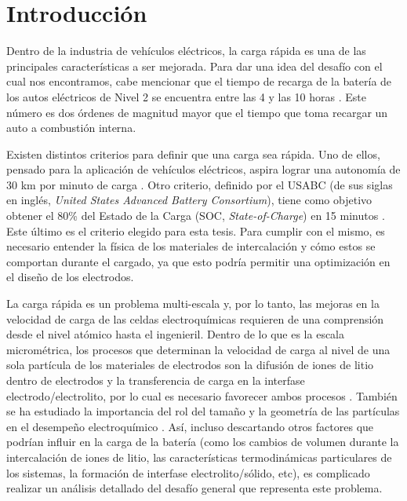 \section{Introducción}

Dentro de la industria de vehículos eléctricos, la carga rápida es una de las principales características a ser 
mejorada. Para dar una idea del desafío con el cual nos encontramos, cabe mencionar que el tiempo 
de recarga de la batería de los autos eléctricos de Nivel 2 se encuentra entre 
las 4 y las 10 horas \cite{evcs}. Este número es dos órdenes de magnitud 
mayor que el tiempo que toma recargar un auto a combustión interna.

Existen distintos criterios para definir que una carga sea rápida. Uno de ellos, 
pensado para la aplicación de vehículos eléctricos, aspira lograr una autonomía de 30 km 
por minuto de carga \cite{dufek2022}. Otro criterio, definido por el USABC (de sus
siglas en inglés, \textit{United States Advanced Battery Consortium}), tiene como
objetivo obtener el 80\% del Estado de la Carga (SOC, \textit{State-of-Charge})
en 15 minutos \cite{USABC}. Este último es el criterio elegido para esta tesis.
Para cumplir con el mismo, es necesario entender la física de los materiales de
intercalación y cómo estos se comportan durante el cargado, ya que esto podría 
permitir una optimización en el diseño de los electrodos.

La carga rápida es un problema multi-escala \cite{franco2013, franco2019} y, por 
lo tanto, las mejoras en la velocidad de carga de las celdas electroquímicas 
requieren de una comprensión desde el nivel atómico hasta el ingenieril. Dentro 
de lo que es la escala micrométrica, los procesos que determinan la velocidad de 
carga al nivel de una sola partícula de los materiales de electrodos son la 
difusión de iones de litio dentro de electrodos y la transferencia de carga en 
la interfase electrodo/electrolito, por lo cual es necesario favorecer ambos
procesos \cite{liu2019, tomaszewska2019, weiss2021}. También se ha estudiado la 
importancia del rol del tamaño y la geometría de las partículas en el desempeño 
electroquímico \cite{gavilan2020, gavilan2022}. Así, incluso descartando
otros factores que podrían influir en la carga de la batería (como los cambios de 
volumen durante la intercalación de iones de litio, las características termodinámicas particulares
de los sistemas, la formación de interfase electrolito/sólido, etc), es complicado
realizar un análisis detallado del desafío general que representa este problema.

